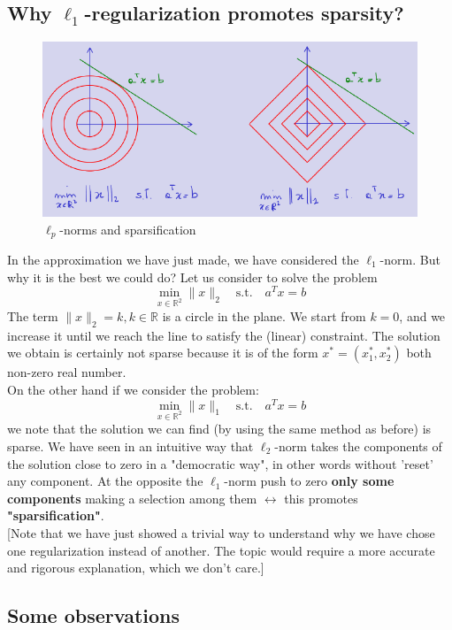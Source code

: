 \subsection{Why $\ell_1$-regularization promotes sparsity?}
\begin{figure}[h]
    \centering
    \includegraphics[scale=0.8]{images/Sparsity.png}
    \caption{$\ell_p$-norms and sparsification}
    \label{fig:enter-label}
\end{figure}
In the approximation we have just made, we have considered the $\ell_1$-norm. But why it is the best we could do? Let us consider to solve the problem $$\min_{x\in\mathbb{R}^2} \lVert x \rVert_2 \quad  \textrm{s.t.} \quad a^Tx=b$$ 
The term $\lVert x \rVert_2=k, k\in\mathbb{R}$ is a circle in the plane. We start from $k=0$, and we increase it until we reach the line to satisfy the (linear) constraint. The solution we obtain is certainly not sparse because it is of the form $x^*=(x_1^*, x_2^*)$ both non-zero real number.\\
\noindent
On the other hand if we consider the problem: 
$$\min_{x\in\mathbb{R}^2} \lVert x \rVert_1 \quad  \textrm{s.t.} \quad a^Tx=b$$ 
we note that the solution we can find (by using the same method as before) is sparse. We have seen in an intuitive way that $\ell_2$-norm takes the components of the solution close to zero in a "democratic way", in other words without 'reset' any component. At the opposite the $\ell_1$-norm push to zero \textbf{only some components} making a selection among them $\longleftrightarrow $ this promotes \textbf{"sparsification"}.\\

\noindent
{
    \color{blue}
    [Note that we have just showed a trivial way to understand why we have chose one regularization instead of another. The topic would require a more accurate and rigorous explanation, which we don't care.]
}

\subsection{Some observations}

